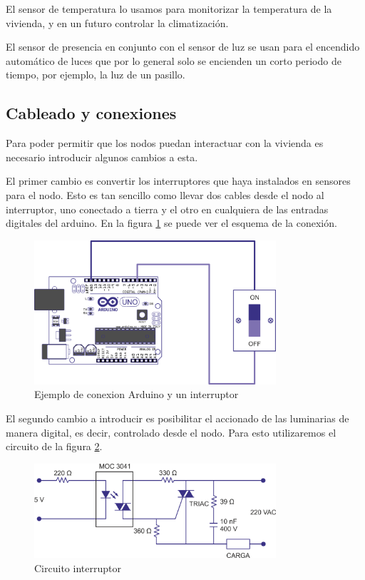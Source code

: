 El sensor de temperatura lo usamos para monitorizar la temperatura de la vivienda, y en un futuro controlar la climatización. 

El sensor de presencia en conjunto con el sensor de luz se usan para el encendido automático de luces que por lo general solo se encienden un corto periodo de tiempo, por ejemplo, la luz de un pasillo.

\subsection{Cableado y conexiones}
 Para poder permitir que los nodos puedan interactuar con la vivienda es necesario introducir algunos cambios a esta.
 
 El primer cambio es convertir los interruptores que haya instalados en sensores para el nodo. Esto es tan sencillo como llevar dos cables desde el nodo al interruptor, uno conectado a tierra y el otro en cualquiera de las entradas digitales del arduino. En la figura \ref{fig:conexion-ard-int} se puede ver el esquema de la conexión.
 
 \begin{figure}[htb]
     \centering
     \includegraphics[width=0.8\textwidth]{imagenes/arduino_interruptor.png}
     \caption{Ejemplo de conexion Arduino y un interruptor}
     \label{fig:conexion-ard-int}
    \end{figure}
 
 
 El segundo cambio a introducir es posibilitar el accionado de las luminarias de manera digital, es decir, controlado desde el nodo. Para esto utilizaremos el circuito de la figura \ref{fig:circuito_int}. 
 
\begin{figure}[htb]
    \centering
    \includegraphics[width=0.8\textwidth]{imagenes/circuito_interruptor.png}
    \caption{Circuito interruptor}
    \label{fig:circuito_int}
\end{figure}
 
